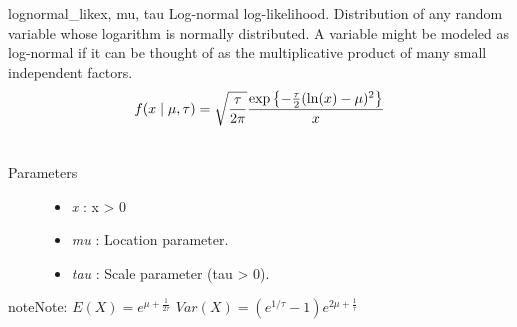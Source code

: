 \hypertarget{pymc.distributions.lognormal_like}{}\begin{funcdesc}{lognormal\_like}{x, mu, tau}
Log-normal log-likelihood. Distribution of any random variable whose
logarithm is normally distributed. A variable might be modeled as
log-normal if it can be thought of as the multiplicative product of many
small independent factors.
\begin{gather}
\begin{split}f(x \mid \mu, \tau) = \sqrt{\frac{\tau}{2\pi}}\frac{
\exp\left\{ -\frac{\tau}{2} (\ln(x)-\mu)^2 \right\}}{x}\end{split}\notag\\\begin{split}\end{split}\notag
\end{gather}\begin{description}
\item[Parameters] \leavevmode\begin{itemize}
\item {} 
\emph{x} : x \textgreater{} 0

\item {} 
\emph{mu} : Location parameter.

\item {} 
\emph{tau} : Scale parameter (tau \textgreater{} 0).

\end{itemize}

\end{description}

\begin{notice}{note}{Note:}
$E(X)=e^{\mu+\frac{1}{2\tau}}$
$Var(X)=(e^{1/\tau}-1)e^{2\mu+\frac{1}{\tau}}$
\end{notice}
\end{funcdesc}

